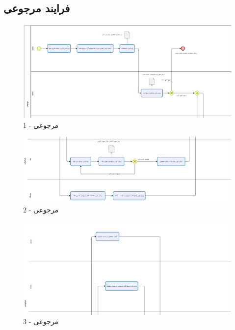 \documentclass[12pt,a4paper]{article}
\begin{document}
	\subsection{فرایند مرجوعی} \label{section.function.return}
		
		\begin{figure}[h!]
			\begin{center}
				\includegraphics[width=14cm]{images/Bizagi Return 1.png}	
			\end{center}
			\caption{مرجوعی - 1}
		\end{figure}
		\begin{figure}[h!]
			\begin{center}
				\includegraphics[width=14cm]{images/Bizagi Return 2.png}	
			\end{center}
			\caption{مرجوعی - 2}
		\end{figure}
		\pagebreak
		\begin{figure}[h!]
			\begin{center}
				\includegraphics[width=14cm]{images/Bizagi Return 3.png}	
			\end{center}
			\caption{مرجوعی - 3}
		\end{figure}
\end{document}
